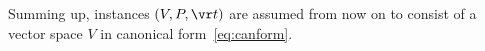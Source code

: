 Summing up, instances $(V, P, \vr t)$ are assumed from now on to consist of 
a vector space $V$ in canonical form~\eqref{eq:canform}.

%
%

